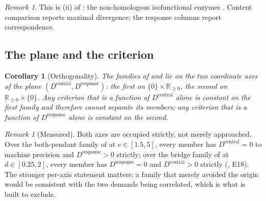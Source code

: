 \documentclass[11pt,twocolumn,a4paper]{article}
\theoremstyle{plain}
\newtheorem{corollary}[theorem]{Corollary}
\theoremstyle{definition}
\theoremstyle{remark}
\newtheorem{remark}[theorem]{Remark}
\newcommand{\dem}{D}
\newcommand{\Rnn}{\mathbb{R}_{\ge 0}}
\begin{document}
\begin{remark}
This is (ii) of : the non-homologous isofunctional
enzymes \cite{omelchenko2010nonhomologous}. Content comparison reports
maximal divergence; the response columns report correspondence.
\end{remark}

\subsection{The plane and the criterion}

\begin{corollary}[Orthogonality]
\label{cor:orth}
The families of  and  lie on
the two coordinate axes of the plane
$(\dem^{\mathrm{central}},\dem^{\mathrm{response}})$: the first on
$\{0\}\times\Rnn$, the second on $\Rnn\times\{0\}$. Any criterion that
is a function of $\dem^{\mathrm{central}}$ alone is constant on the
first family and therefore cannot separate its members; any criterion
that is a function of $\dem^{\mathrm{response}}$ alone is constant on
the second.
\end{corollary}

\begin{remark}[Measured]
\label{rem:orthmeasured}
Both axes are occupied strictly, not merely approached. Over the
both-pendant family of  at $c\in[1.5,5]$, every
member has $\dem^{\mathrm{central}}=0$ to machine precision and
$\dem^{\mathrm{response}}>0$ strictly; over the bridge family of
 at $d\in[0.25,2]$, every member has
$\dem^{\mathrm{response}}=0$ and $\dem^{\mathrm{central}}>0$ strictly
(, E18). The stronger per-axis statement matters:
a family that merely avoided the origin would be consistent with the two
demands being correlated, which is what  is built to
exclude.
\end{remark}
\end{document}
